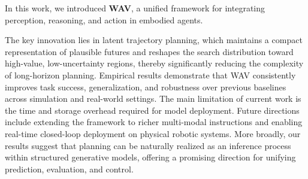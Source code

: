 
In this work, we introduced \textbf{WAV}, a unified framework for integrating perception, reasoning, and action in embodied agents. 

The key innovation lies in latent trajectory planning, which maintains a compact representation of plausible futures and reshapes the search distribution toward high-value, low-uncertainty regions, thereby significantly reducing the complexity of long-horizon planning. 
Empirical results demonstrate that WAV consistently improves task success, generalization, and robustness over previous baselines across simulation and real-world settings.
The main limitation of current work is the time and storage overhead required for model deployment.
Future directions include extending the framework to richer multi-modal instructions and enabling real-time closed-loop deployment on physical robotic systems.
More broadly, our results suggest that planning can be naturally realized as an inference process within structured generative models, offering a promising direction for unifying prediction, evaluation, and control.




\newpage
\appendix
\onecolumn
